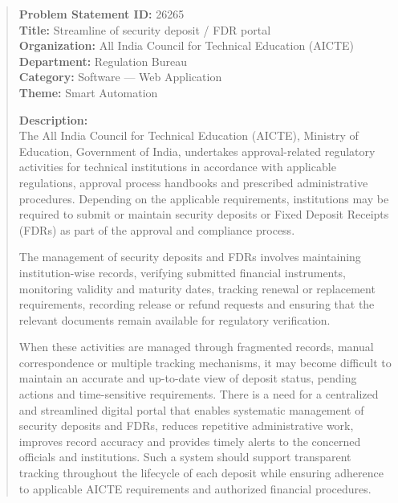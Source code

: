 \documentclass[12pt, a4paper]{report}
\begin{document}
\begin{quote}
\textbf{Problem Statement ID:} 26265 \\
\textbf{Title:} Streamline of security deposit / FDR portal \\
\textbf{Organization:} All India Council for Technical Education (AICTE) \\
\textbf{Department:} Regulation Bureau \\
\textbf{Category:} Software --- Web Application \\
\textbf{Theme:} Smart Automation

\vspace{0.4cm}
\textbf{Description:} \\
The All India Council for Technical Education (AICTE), Ministry of Education, Government of India, undertakes approval-related regulatory activities for technical institutions in accordance with applicable regulations, approval process handbooks and prescribed administrative procedures. Depending on the applicable requirements, institutions may be required to submit or maintain security deposits or Fixed Deposit Receipts (FDRs) as part of the approval and compliance process. 

The management of security deposits and FDRs involves maintaining institution-wise records, verifying submitted financial instruments, monitoring validity and maturity dates, tracking renewal or replacement requirements, recording release or refund requests and ensuring that the relevant documents remain available for regulatory verification. 

When these activities are managed through fragmented records, manual correspondence or multiple tracking mechanisms, it may become difficult to maintain an accurate and up-to-date view of deposit status, pending actions and time-sensitive requirements. There is a need for a centralized and streamlined digital portal that enables systematic management of security deposits and FDRs, reduces repetitive administrative work, improves record accuracy and provides timely alerts to the concerned officials and institutions. Such a system should support transparent tracking throughout the lifecycle of each deposit while ensuring adherence to applicable AICTE requirements and authorized financial procedures.


\end{quote}
\end{document}
